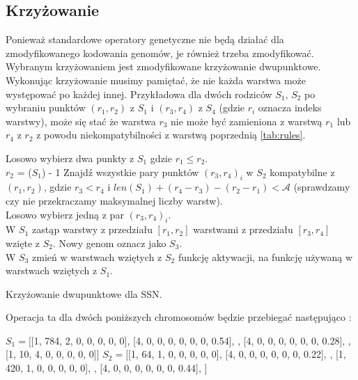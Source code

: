 \documentclass{article}
\begin{document}
\subsection{Krzyżowanie}
Ponieważ standardowe operatory genetyczne nie będą działać dla zmodyfikowanego kodowania
genomów, je również trzeba zmodyfikować. Wybranym krzyżowaniem jest zmodyfikowane krzyżowanie
dwupunktowe. Wykonując krzyżowanie musimy pamiętać, że nie każda warstwa może występować po 
każdej innej. Przykładowa dla dwóch rodziców $S_1$, $S_2$ po wybraniu punktów $(r_1, r_2)$ z 
$S_1$ i $(r_3, r_4)$ z $S_4$ (gdzie $r_i$ oznacza indeks warstwy), może się stać że warstwa
$r_3$ nie może być zamieniona z warstwą $r_1$ lub $r_4$ z $r_2$ z powodu niekompatybilności
z warstwą poprzednią \ref{tab:rules}.\\
\begin{algorithm}[H]
	Losowo wybierz dwa punkty z $S_1$ gdzie $r_1 \leq r_2$.\\
	 {
		$r_2$ = ($S_1$) - 1
	}
	Znajdź wszystkie pary punktów $(r_3, r_4)_i$ w $S_2$ kompatybilne z $(r_1, r_2)$,
	gdzie $r_3 < r_4$ i $len(S_1) + (r_4 - r_3) - (r_2 - r_1) < \mathcal{A}$
	(sprawdzamy czy nie przekraczamy maksymalnej liczby warstw).\\
	Losowo wybierz jedną z par $(r_3, r_4)_i$.\\
	W $S_1$ zastąp warstwy z przedziału $[r_1, r_2]$ warstwami z przedziału $[r_3, r_4]$
	wzięte z $S_2$. Nowy genom oznacz jako $S_3$.\\
	W $S_3$ zmień w warstwach wziętych z $S_2$ funkcję aktywacji, na funkcję 
	używaną w warstwach wziętych z  $S_1$.
	\caption{Krzyżowanie dwupunktowe dla SSN.}
\end{algorithm}
Operacja ta dla dwóch poniższych chromosomów będzie przebiegać następująco \cite{ams}:\\
\begin{center}

	$S_1 = \big[$[1, 784, 2, 0, 0, 0, 0, 0], [4, 0, 0, 0, 0, 0, 0, 0.54], 
	            \newline 
	            [1, 300, 2, 0, 0, 0, 0, 0], [4, 0, 0, 0, 0, 0, 0, 0.28], 
		    \newline 
		    [1, 100, 2, 0, 0, 0, 0, 0], [1, 10, 4, 0, 0, 0, 0, 0]$\big]$
	\newline
	\newline
	$S_2 = \big[$[1, 64, 1, 0, 0, 0, 0, 0], [4, 0, 0, 0, 0, 0, 0, 0.22],
		    \newline
		    [1, 333, 1, 0, 0, 0, 0, 0], [1, 420, 1, 0, 0, 0, 0, 0],
		    \newline
		    [1, 77, 1, 0, 0, 0, 0, 0], [4, 0, 0, 0, 0, 0, 0, 0.44],
		    \newline
		    [1, 10, 4, 0, 0, 0, 0, 0]$\big]$
	\newline
\end{center}
\end{document}
